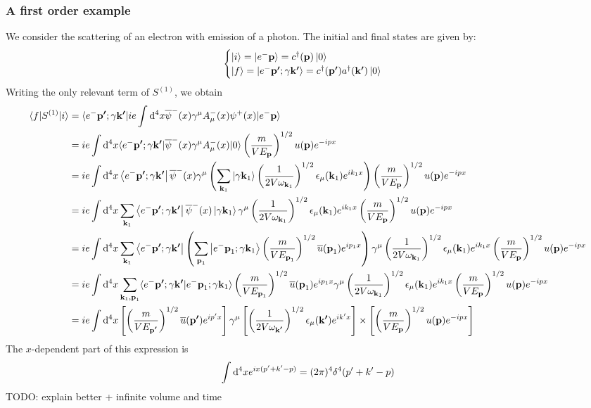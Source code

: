 \subsubsection{A first order example}
We consider the scattering of an electron with emission of a photon. The initial and final states are given by:
\[ \begin{cases}
\left| i \right\rangle = \left| e^-\bm{\mathrm{p}} \right\rangle = c^\dagger(\bm{\mathrm{p}})\left| 0 \right\rangle \\
\left| f \right\rangle = \left| e^-\bm{\mathrm{p'}};\gamma\bm{\mathrm{k'}} \right\rangle = c^\dagger(\bm{\mathrm{p'}})a^\dagger(\bm{\mathrm{k'}})\left| 0 \right\rangle
\end{cases} \]
Writing the only relevant term of $S^{(1)}$, we obtain
\begin{align*}
\braket[S^{(1)}]{f}{i} &= \braket[ie\int \diff{^4x}\overline{\psi}^-(x)\gamma^\mu A_\mu^-(x)\psi^+(x)]{e^-\vec{p'};\gamma\vec{k'}}{e^-\vec{p}} \\
&= ie\int \diff{^4x}\braket[\overline{\psi}^-(x)\gamma^\mu A_\mu^-(x)]{e^-\vec{p'};\gamma\vec{k'}}{0}\left(\frac{m}{VE_{\vec{p}}}\right)^{1/2}u(\vec{p})e^{-ipx} \\
&= ie\int \diff{^4x}\bra{e^-\vec{p'};\gamma\vec{k'}}\overline{\psi}^-(x)\gamma^\mu \left(\sum_{\vec{k}_1}\ket{\gamma\vec{k}_1}\left(\frac{1}{2V\omega_{\vec{k}_1}}\right)^{1/2}\epsilon_{\mu}(\vec{k}_1)e^{ik_1x}\right)\left(\frac{m}{VE_{\vec{p}}}\right)^{1/2}u(\vec{p})e^{-ipx} \\
&= ie\int\diff{^4x} \sum_{\vec{k}_1} \bra{e^-\vec{p'};\gamma\vec{k'}}\overline{\psi}^-(x)\ket{\gamma\vec{k}_1}\gamma^\mu\left(\frac{1}{2V\omega_{\vec{k}_1}}\right)^{1/2}\epsilon_{\mu}(\vec{k}_1)e^{ik_1x}\left(\frac{m}{VE_{\vec{p}}}\right)^{1/2}u(\vec{p})e^{-ipx} \\
&= ie\int\diff{^4x} \sum_{\vec{k}_1} \bra{e^-\vec{p'};\gamma\vec{k'}}\left(\sum_{\vec{p}_1}\ket{e^-\vec{p}_1;\gamma\vec{k}_1}\left(\frac{m}{VE_{\vec{p}_1}}\right)^{1/2}\overline{u}(\vec{p}_1)e^{ip_1x}\right)\gamma^\mu\left(\frac{1}{2V\omega_{\vec{k}_1}}\right)^{1/2}\epsilon_{\mu}(\vec{k}_1)e^{ik_1x}\left(\frac{m}{VE_{\vec{p}}}\right)^{1/2}u(\vec{p})e^{-ipx} \\
&= ie\int\diff{^4x} \sum_{\vec{k}_1, \vec{p}_1} \braket{e^-\vec{p'};\gamma\vec{k'}}{e^-\vec{p}_1;\gamma\vec{k}_1}\left(\frac{m}{VE_{\vec{p}_1}}\right)^{1/2}\overline{u}(\vec{p}_1)e^{ip_1x}\gamma^\mu\left(\frac{1}{2V\omega_{\vec{k}_1}}\right)^{1/2}\epsilon_{\mu}(\vec{k}_1)e^{ik_1x}\left(\frac{m}{VE_{\vec{p}}}\right)^{1/2}u(\vec{p})e^{-ipx} \\
&= ie \int \diff{^4x} \left[\left(\frac{m}{VE_{\vec{p'}}}\right)^{1/2}\overline{u}(\vec{p'})e^{ip'x}\right]\gamma^\mu \left[\left(\frac{1}{2V\omega_{\vec{k'}}}\right)^{1/2}\epsilon_\mu(\vec{k'})e^{ik'x}\right] \times \left[\left(\frac{m}{VE_{\vec{p}}}\right)^{1/2}u(\vec{p})e^{-ipx}\right]
\end{align*}
The $x$-dependent part of this expression is
\[ \int \operatorname{d \!}{^4x}e^{ix(p'+k'-p)} = (2\pi)^4\delta^4(p'+k'-p) \]
TODO: explain better + infinite volume and time

